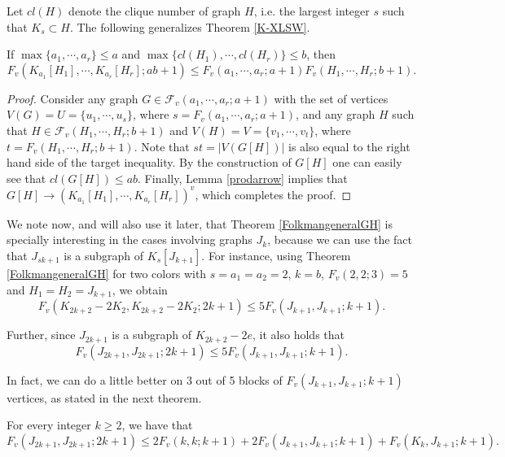 \medskip
Let $cl(H)$ denote the clique number of graph $H$,
i.e. the largest integer $s$ such that $K_s \subset H$.
The following generalizes Theorem \ref{K-XLSW}.

\medskip
\begin{theorem}  \label{FolkmangeneralGH}
If $\max \{a_1, \cdots, a_r\} \leq a$ and
$\max \{cl(H_1), \cdots, cl(H_r)\} \leq b$, then
$$F_v(K_{a_1}[H_1], \cdots, K_{a_r}[H_r];ab+1)
\leq F_v(a_1, \cdots, a_r; a+1) F_v(H_1, \cdots, H_r;b+1).$$
\end{theorem}

\begin{proof}
Consider any graph
$G \in \mathcal{F}_v(a_1,\cdots,a_r;a+1)$
with the set of vertices $V(G)=U=\{u_1,\cdots,u_s\}$,
where $s=F_v(a_1,\cdots,a_r;a+1)$,
and any graph $H$ such that
$H \in \mathcal{F}_v(H_1,\cdots,H_r;b+1)$
and $V(H)=V=\{v_1,\cdots,v_t\}$,
where $t=F_v(H_1,\cdots,H_r;b+1)$.
Note that $st=|V(G[H])|$ is also equal to
the right hand side of the target inequality.
By the construction of $G[H]$
one can easily see that $cl(G[H]) \le ab$. Finally,
Lemma \ref{prodarrow} implies that
$G[H] \rightarrow (K_{a_1}[H_1], \cdots, K_{a_r}[H_r])^v$,
which completes the proof.
\end{proof}

\medskip
We note now, and will also use it later, that
Theorem \ref{FolkmangeneralGH} is specially
interesting in the cases involving graphs $J_k$,
because we can use the fact that $J_{sk+1}$
is a subgraph of $K_s[J_{k+1}]$. For instance,
using Theorem \ref{FolkmangeneralGH} for two
colors with $s=a_1=a_2=2$, $k=b$, $F_v(2,2;3)=5$
and $H_1=H_2=J_{k+1}$, we obtain
$$F_v(K_{2k+2}-2K_2,K_{2k+2}-2K_2;2k+1)
\leq 5F_v(J_{k+1},J_{k+1};k+1).$$

\smallskip
Further, since
$J_{2k+1}$ is a subgraph of $K_{2k+2}-2e$,
it also holds that
$$F_v(J_{2k+1},J_{2k+1};2k+1) \leq
5F_v(J_{k+1},J_{k+1};k+1).$$

\medskip
In fact, we can do a little better on 3 out of 5
blocks of $F_v(J_{k+1},J_{k+1};k+1)$ vertices,
as stated in the next theorem.

\medskip
\begin{theorem}  \label{FvK{2k+1}-e}
For every integer $k \geq 2$, we have that
$F_v(J_{2k+1},J_{2k+1};2k+1) \leq
2F_v(k,k;k+1) + 2F_v(J_{k+1},J_{k+1};k+1)
+ F_v(K_k,J_{k+1};k+1).$
\end{theorem}

